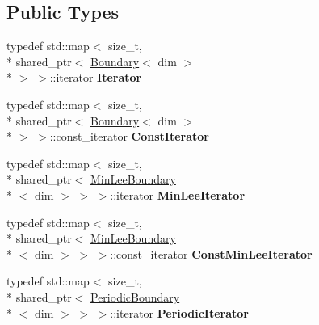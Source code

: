 \subsection*{Public Types}
\begin{DoxyCompactItemize}
\item 
\hypertarget{classnatrium_1_1BoundaryCollection_a8f113a1640c2f088c86f24cf9ddf4be6}{typedef std\-::map$<$ size\-\_\-t, \\*
shared\-\_\-ptr$<$ \hyperlink{classnatrium_1_1Boundary}{Boundary}$<$ dim $>$\\*
 $>$ $>$\-::iterator {\bfseries Iterator}}\label{classnatrium_1_1BoundaryCollection_a8f113a1640c2f088c86f24cf9ddf4be6}

\item 
\hypertarget{classnatrium_1_1BoundaryCollection_a7b7a9bd9ff95ffe3cfdec0d6efcbdf81}{typedef std\-::map$<$ size\-\_\-t, \\*
shared\-\_\-ptr$<$ \hyperlink{classnatrium_1_1Boundary}{Boundary}$<$ dim $>$\\*
 $>$ $>$\-::const\-\_\-iterator {\bfseries Const\-Iterator}}\label{classnatrium_1_1BoundaryCollection_a7b7a9bd9ff95ffe3cfdec0d6efcbdf81}

\item 
\hypertarget{classnatrium_1_1BoundaryCollection_aba4f994dd4290e55b888ac51800bbe9e}{typedef std\-::map$<$ size\-\_\-t, \\*
shared\-\_\-ptr$<$ \hyperlink{classnatrium_1_1MinLeeBoundary}{Min\-Lee\-Boundary}\\*
$<$ dim $>$ $>$ $>$\-::iterator {\bfseries Min\-Lee\-Iterator}}\label{classnatrium_1_1BoundaryCollection_aba4f994dd4290e55b888ac51800bbe9e}

\item 
\hypertarget{classnatrium_1_1BoundaryCollection_a5248927752b4e9ac21dfc1a3e010e79d}{typedef std\-::map$<$ size\-\_\-t, \\*
shared\-\_\-ptr$<$ \hyperlink{classnatrium_1_1MinLeeBoundary}{Min\-Lee\-Boundary}\\*
$<$ dim $>$ $>$ $>$\-::const\-\_\-iterator {\bfseries Const\-Min\-Lee\-Iterator}}\label{classnatrium_1_1BoundaryCollection_a5248927752b4e9ac21dfc1a3e010e79d}

\item 
\hypertarget{classnatrium_1_1BoundaryCollection_a7cf1943ddd37e2d31d41483365de04a2}{typedef std\-::map$<$ size\-\_\-t, \\*
shared\-\_\-ptr$<$ \hyperlink{classnatrium_1_1PeriodicBoundary}{Periodic\-Boundary}\\*
$<$ dim $>$ $>$ $>$\-::iterator {\bfseries Periodic\-Iterator}}\label{classnatrium_1_1BoundaryCollection_a7cf1943ddd37e2d31d41483365de04a2}


\end{DoxyCompactItemize}
